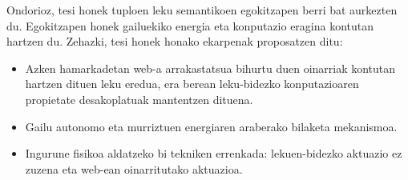 \begin{laburpena}
Ondorioz, tesi honek tuploen leku semantikoen egokitzapen berri bat aurkezten du. %
Egokitzapen honek gailuekiko energia eta konputazio eragina kontutan hartzen du.
Zehazki, tesi honek honako ekarpenak proposatzen ditu:
\begin{itemize}
   \item Azken hamarkadetan web-a arrakastatsua bihurtu duen oinarriak kontutan hartzen dituen leku eredua, era berean leku-bidezko konputazioaren propietate desakoplatuak mantentzen dituena.
  \item Gailu autonomo eta murriztuen energiaren araberako bilaketa mekanismoa.
  \item Ingurune fisikoa aldatzeko bi tekniken errenkada: lekuen-bidezko aktuazio ez zuzena eta web-ean oinarritutako aktuazioa.
\end{itemize}
\end{laburpena}



